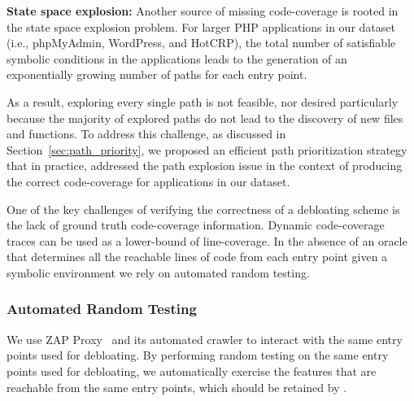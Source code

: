 {\noindent \textbf{State space explosion:} 
Another source of missing code-coverage is rooted in the state space explosion problem. 
For larger PHP applications in our dataset (i.e., phpMyAdmin, WordPress, and HotCRP), the total number of satisfiable symbolic conditions in the applications leads to the generation of an exponentially growing number of paths for each entry point. 

As a result, exploring every single path is not feasible, nor desired particularly because the majority of explored paths do not lead to the discovery of new files and functions.  
To address this challenge, as discussed in Section~\ref{sec:path_priority}, we proposed an efficient path prioritization strategy that in practice, addressed the path explosion issue in the context of producing the correct code-coverage for applications in our dataset. 

One of the key challenges of verifying the correctness of a debloating scheme is the lack of ground truth code-coverage information. 
Dynamic code-coverage traces can be used as a lower-bound of line-coverage. 
In the absence of an oracle that determines all the reachable lines of code from each entry point given a symbolic environment we rely on automated random testing. 

\subsubsection{Automated Random Testing}
\label{sec:automated_random_testing}
We use ZAP Proxy~\cite{zapproxy} and its automated crawler to interact with the same entry points used for debloating. 
By performing random testing on the same entry points used for debloating, we automatically exercise the features that are reachable from the same entry points, which should be retained by \animatedead{}. 

}
